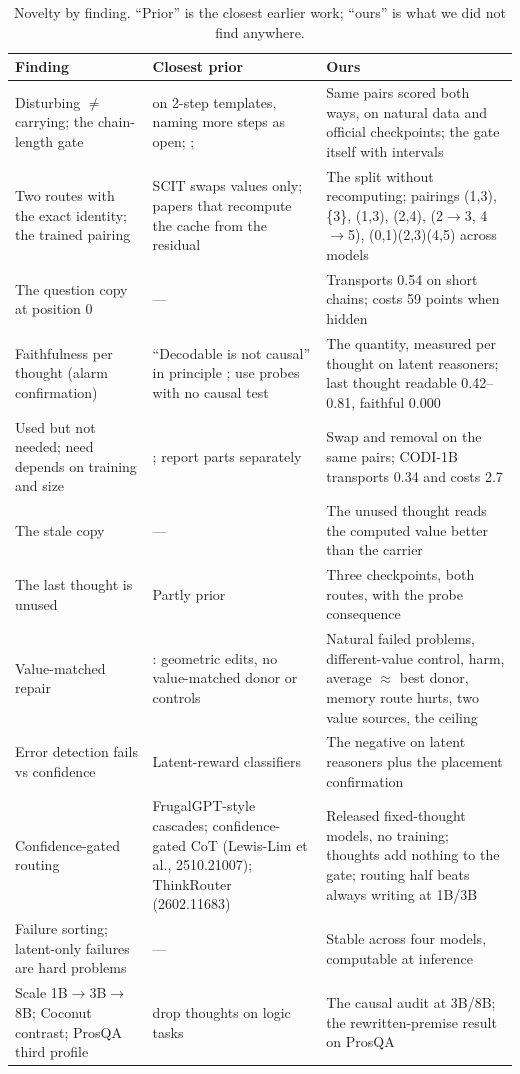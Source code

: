 \documentclass{article}
\begin{document}
\begin{table}[h]
\caption{Novelty by finding. ``Prior'' is the closest earlier work; ``ours'' is what we did not find anywhere.}
\label{tab:novelty}
\centering\scriptsize
\setlength{\tabcolsep}{4pt}
\begin{tabular}{p{4.1cm}p{4.3cm}p{4.6cm}}
\toprule
Finding & Closest prior & Ours \\
\midrule
Disturbing $\ne$ carrying; the chain-length gate & \citet{cywinski2025} on 2-step templates, naming more steps as open; \citet{ding2026scit}; \citet{li2026dynamics} & Same pairs scored both ways, on natural data and official checkpoints; the gate itself with intervals \\
Two routes with the exact identity; the trained pairing & SCIT swaps values only; papers that recompute the cache from the residual & The split without recomputing; pairings (1,3), \{3\}, (1,3), (2,4), (2$\to$3, 4$\to$5), (0,1)(2,3)(4,5) across models \\
The question copy at position 0 & --- & Transports 0.54 on short chains; costs 59 points when hidden \\
Faithfulness per thought (alarm confirmation) & ``Decodable is not causal'' in principle \citep{openproblems2025,decodability2026}; \citet{ramjee2026ulterior} use probes with no causal test & The quantity, measured per thought on latent reasoners; last thought readable 0.42--0.81, faithful 0.000 \\
Used but not needed; need depends on training and size & \citet{jin2026final}; \citet{li2026dynamics} report parts separately & Swap and removal on the same pairs; CODI-1B transports 0.34 and costs 2.7 \\
The stale copy & --- & The unused thought reads the computed value better than the carrier \\
The last thought is unused & Partly prior \citep{cywinski2025} & Three checkpoints, both routes, with the probe consequence \\
Value-matched repair & \citet{chang2026unlocking}: geometric edits, no value-matched donor or controls & Natural failed problems, different-value control, harm, average $\approx$ best donor, memory route hurts, two value sources, the ceiling \\
Error detection fails vs confidence & Latent-reward classifiers \citep{lto2026} & The negative on latent reasoners plus the placement confirmation \\
Confidence-gated routing & FrugalGPT-style cascades; confidence-gated CoT (Lewis-Lim et al., 2510.21007); ThinkRouter (2602.11683) & Released fixed-thought models, no training; thoughts add nothing to the gate; routing half beats always writing at 1B/3B \\
Failure sorting; latent-only failures are hard problems & --- & Stable across four models, computable at inference \\
Scale 1B$\to$3B$\to$8B; Coconut contrast; ProsQA third profile & \citet{dilgren2026interpretable} drop thoughts on logic tasks & The causal audit at 3B/8B; the rewritten-premise result on ProsQA \\
\bottomrule
\end{tabular}
\end{table}
\end{document}

